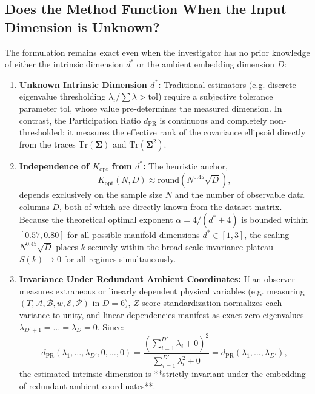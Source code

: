 \documentclass[11pt,a4paper]{article}
\begin{document}
\subsection{Does the Method Function When the Input Dimension is Unknown?}
The formulation remains exact even when the investigator has no prior knowledge of either the intrinsic dimension $d^*$ or the ambient embedding dimension $D$:
\begin{enumerate}
    \item \textbf{Unknown Intrinsic Dimension $d^*$:} Traditional estimators (e.g. discrete eigenvalue thresholding $\lambda_i / \sum \lambda > \mathrm{tol}$) require a subjective tolerance parameter $\mathrm{tol}$, whose value pre-determines the measured dimension. In contrast, the Participation Ratio $d_{\mathrm{PR}}$ is continuous and completely non-thresholded: it measures the effective rank of the covariance ellipsoid directly from the traces $\mathrm{Tr}(\mathbf{\Sigma})$ and $\mathrm{Tr}(\mathbf{\Sigma}^2)$.
    \item \textbf{Independence of $K_{\mathrm{opt}}$ from $d^*$:} The heuristic anchor,
    \begin{equation}
        K_{\mathrm{opt}}(N, D) \approx \mathrm{round}\left(N^{0.45}\sqrt{D}\right),
    \end{equation}
    depends exclusively on the sample size $N$ and the number of observable data columns $D$, both of which are directly known from the dataset matrix. Because the theoretical optimal exponent $\alpha = 4/(d^*+4)$ is bounded within $[0.57, 0.80]$ for all possible manifold dimensions $d^* \in [1, 3]$, the scaling $N^{0.45}\sqrt{D}$ places $k$ securely within the broad scale-invariance plateau $S(k) \to 0$ for all regimes simultaneously.
    \item \textbf{Invariance Under Redundant Ambient Coordinates:} If an observer measures extraneous or linearly dependent physical variables (e.g. measuring $(T, \mathcal{A}, \mathcal{B}, w, \mathcal{E}, \mathcal{P})$ in $D=6$), $Z$-score standardization normalizes each variance to unity, and linear dependencies manifest as exact zero eigenvalues $\lambda_{D'+1} = \dots = \lambda_D = 0$. Since:
    \begin{equation}
        d_{\mathrm{PR}}(\lambda_1, \dots, \lambda_{D'}, 0, \dots, 0) = \frac{\left(\sum_{i=1}^{D'} \lambda_i + 0\right)^2}{\sum_{i=1}^{D'} \lambda_i^2 + 0} = d_{\mathrm{PR}}(\lambda_1, \dots, \lambda_{D'}),
    \end{equation}
    the estimated intrinsic dimension is **strictly invariant under the embedding of redundant ambient coordinates**.
\end{enumerate}
\end{document}

